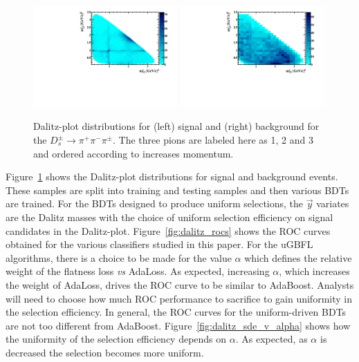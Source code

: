 \begin{figure}[] 
  \centering 
  \includegraphics[width=0.49\textwidth]{DP_sig.pdf}
  \includegraphics[width=0.49\textwidth]{DP_bkgd.pdf}
  \caption{\label{fig:dalitz} Dalitz-plot distributions for (left) signal and (right) background for the $D_s^\pm\to\pi^+\pi^-\pi^\pm$.  The three pions are labeled here as 1, 2 and 3 and ordered according to increases momentum.}
\end{figure}

Figure~\ref{fig:dalitz} shows the Dalitz-plot distributions for signal and background events.  These samples are split into training and testing samples and then various BDTs are trained.  For the BDTs designed to produce uniform selections, the $\vec{y}$ variates are the Dalitz masses with the choice of uniform selection efficiency on signal candidates in the Dalitz-plot.  
Figure~\ref{fig:dalitz_rocs} shows the ROC curves obtained for the various classifiers studied in this paper.  For the uGBFL algorithms, there is a choice to be made for the value $\alpha$ which defines the relative weight of the flatness loss {\em vs} AdaLoss.  As expected, increasing $\alpha$, which increases the weight of AdaLoss, drives the ROC curve to be similar to AdaBoost.  Analysts will need to choose how much ROC performance to sacrifice to gain uniformity in the selection efficiency.  In general, the ROC curves for the uniform-driven BDTs are not too different from AdaBoost.  Figure~\ref{fig:dalitz_sde_v_alpha} shows how the uniformity of the selection efficiency depends on $\alpha$.  As expected, as $\alpha$ is decreased the selection becomes more uniform.



